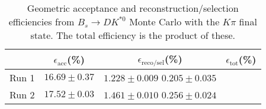\begin{table}
    \centering
    \begin{tabular}{cccc}
        \toprule
        & $\epsilon_\mathrm{acc}$(\%) &  $\epsilon_\mathrm{reco/sel}$(\%) &  $\epsilon_\mathrm{tot}$(\%) \\
        \midrule
        Run 1 & $16.69 \pm 0.37$ & $1.228 \pm 0.009$ $0.205 \pm 0.035$ \\
        Run 2 & $17.52 \pm 0.03$ & $1.461 \pm 0.010$ $0.256 \pm 0.024$ \\
        \bottomrule
    \end{tabular}
    \caption{Geometric acceptance and reconstruction/selection efficiencies from  $B_s \to DK^{*0}$ Monte Carlo with the $K\pi$ final state.  The total efficiency is the product of these.}
\label{tab:selection_efficiency_Bs}
\end{table}
